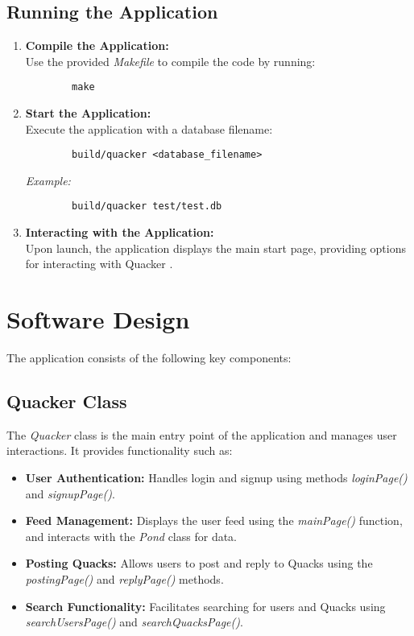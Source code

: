 \documentclass[12pt]{article}
\begin{document}
  \subsection*{Running the Application}
	\begin{enumerate}
		\item \textbf{Compile the Application:} \\
		Use the provided \textit{Makefile} to compile the code by running:
		\begin{verbatim}
		make
		\end{verbatim}
		\item \textbf{Start the Application:} \\
		Execute the application with a database filename:
		\begin{verbatim}
		build/quacker <database_filename>
		\end{verbatim}
		\textit{Example:}
		\begin{verbatim}
		build/quacker test/test.db
		\end{verbatim}
		\item \textbf{Interacting with the Application:} \\
		Upon launch, the application displays the main start page, providing options for interacting with Quacker .
	\end{enumerate}
\newpage

\section{Software Design}
The application consists of the following key components:

	\subsection*{Quacker Class}
	The \textit{Quacker} class is the main entry point of the application and manages user interactions. It provides functionality such as:
	\begin{itemize}
		\item \textbf{User Authentication:} Handles login and signup using methods \textit{loginPage()} and \textit{signupPage()}.
		\item \textbf{Feed Management:} Displays the user feed using the \textit{mainPage()} function, and interacts with the \textit{Pond} class for data.
		\item \textbf{Posting Quacks:} Allows users to post and reply to Quacks using the \textit{postingPage()} and \textit{replyPage()} methods.
		\item \textbf{Search Functionality:} Facilitates searching for users and Quacks using \textit{searchUsersPage()} and \textit{searchQuacksPage()}.
	\end{itemize}
\end{document}
